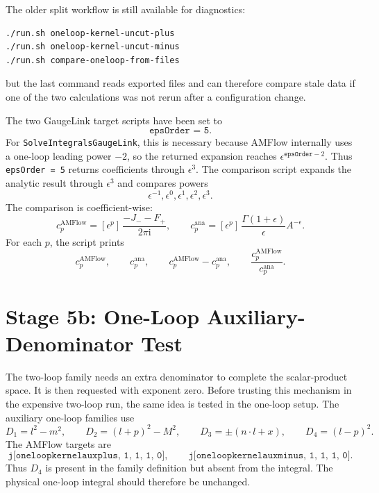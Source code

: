 \documentclass[11pt]{article}
\newcommand{\ii}{\mathrm{i}}
\newcommand{\eps}{\epsilon}
\newcommand{\WL}[1]{\texttt{#1}}
\begin{document}
The older split workflow is still available for diagnostics:
\begin{verbatim}
./run.sh oneloop-kernel-uncut-plus
./run.sh oneloop-kernel-uncut-minus
./run.sh compare-oneloop-from-files
\end{verbatim}
but the last command reads exported files and can therefore compare stale data
if one of the two calculations was not rerun after a configuration change.

The two GaugeLink target scripts have been set to
\begin{equation}
  \WL{epsOrder = 5}.
\end{equation}
For \WL{SolveIntegralsGaugeLink}, this is necessary because AMFlow internally
uses a one-loop leading power \(-2\), so the returned expansion reaches
\(\eps^{\WL{epsOrder}-2}\). Thus \WL{epsOrder = 5} returns coefficients
through \(\eps^3\). The comparison script expands the analytic result through
\(\eps^3\) and compares powers
\begin{equation}
  \eps^{-1},\eps^0,\eps^1,\eps^2,\eps^3.
\end{equation}
The comparison is coefficient-wise:
\begin{equation}
  c_p^{\mathrm{AMFlow}}
  =
  [\eps^p]\,
  \frac{-J_--F_+}{2\pi\ii},
  \qquad
  c_p^{\mathrm{ana}}
  =
  [\eps^p]\,
  \frac{\Gamma(1+\eps)}{\eps}A^{-\eps}.
\end{equation}
For each \(p\), the script prints
\begin{equation}
  c_p^{\mathrm{AMFlow}},\qquad
  c_p^{\mathrm{ana}},\qquad
  c_p^{\mathrm{AMFlow}}-c_p^{\mathrm{ana}},\qquad
  \frac{c_p^{\mathrm{AMFlow}}}{c_p^{\mathrm{ana}}}.
\end{equation}

\section{Stage 5b: One-Loop Auxiliary-Denominator Test}

The two-loop family needs an extra denominator to complete the scalar-product
space. It is then requested with exponent zero. Before trusting this mechanism
in the expensive two-loop run, the same idea is tested in the one-loop setup.
The auxiliary one-loop families use
\begin{equation}
  D_1=l^2-m^2,\qquad
  D_2=(l+p)^2-M^2,\qquad
  D_3=\pm(n\cdot l+x),\qquad
  D_4=(l-p)^2.
\end{equation}
The AMFlow targets are
\begin{equation}
  \WL{j[oneloopkernelauxplus, 1, 1, 1, 0]},
  \qquad
  \WL{j[oneloopkernelauxminus, 1, 1, 1, 0]}.
\end{equation}
Thus \(D_4\) is present in the family definition but absent from the integral.
The physical one-loop integral should therefore be unchanged.
\end{document}
